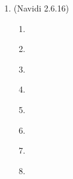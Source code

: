 \documentclass[11pt]{article}
\newcommand\Item[1][]{%
  \ifx\relax#1\relax  \item \else \item[#1] \fi
  \abovedisplayskip=0pt\abovedisplayshortskip=0pt~\vspace*{-\baselineskip}}
\begin{document}
\begin{enumerate}
\begin{enumerate}
                \Item \\
                $E(Y|X=1)=\sum_{y}y{\cdot}p_{Y|X}(y|1)\\
                (0)0.36+(1)0.28+(2)0.2+(3)0.16=1.16$ \\
                
                \Item \\
                $E(X|Y=2)=\sum_{x}x{\cdot}p_{X|Y}(x|2)\\
                0\frac{1}{2}+1\frac{5}{22}+2\frac{2}{11}+3\frac{1}{11} =\frac{19}{22}  
                $

        \end{enumerate}

        \item (Navidi 2.6.16) %
        \begin{enumerate}
                \Item \\
                \Item \\
                \Item \\
                \Item \\
        \end{enumerate}
\end{enumerate}
\end{document}
